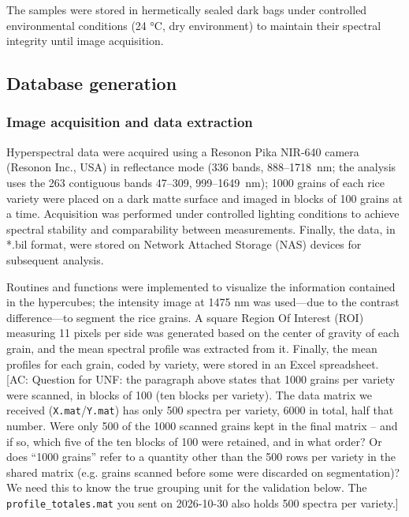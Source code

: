 \documentclass[final,5p,times,twocolumn]{elsarticle}
\newcommand{\added}[1]{{\color{blue}#1}}
\newcommand{\acnote}[1]{{\color{red}\small\textsf{[AC: #1]}}}
\begin{document}
The samples were stored in hermetically sealed dark bags under controlled environmental conditions (24 °C, dry environment) to maintain their spectral integrity until image acquisition.

\subsection{Database generation}\label{sec_database}

\subsubsection{Image acquisition and data extraction} 

Hyperspectral data were acquired using a Resonon Pika NIR-640 camera (Resonon Inc., USA) in reflectance mode \added{(336 bands, 888--1718~nm; the analysis uses the 263 contiguous bands 47--309, 999--1649~nm)}; \added{1000 grains of each rice variety were placed on a dark matte surface and imaged in blocks of 100 grains at a time.}
Acquisition was performed under controlled lighting conditions to achieve spectral stability and comparability between measurements.
\added{Finally, the data, in *.bil format, were stored on Network Attached Storage (NAS) devices for subsequent analysis.} 

Routines and functions were implemented to visualize the information contained in the hypercubes; the intensity image at 1475 nm was used—due to the contrast difference—to segment the rice grains.
A square Region Of Interest (ROI) measuring 11 pixels per side was generated based on the center of gravity of each grain, and the mean spectral profile was extracted from it.
Finally, the mean profiles for each grain, coded by variety, were stored in an Excel spreadsheet.
\acnote{Question for UNF: the paragraph above states that 1000 grains per variety were scanned, in blocks of 100 (ten blocks per variety). The data matrix we received (\texttt{X.mat}/\texttt{Y.mat}) has only 500 spectra per variety, 6000 in total, half that number. Were only 500 of the 1000 scanned grains kept in the final matrix -- and if so, which five of the ten blocks of 100 were retained, and in what order? Or does ``1000 grains'' refer to a quantity other than the 500 rows per variety in the shared matrix (e.g. grains scanned before some were discarded on segmentation)? We need this to know the true grouping unit for the validation below. The \texttt{profile\_totales.mat} you sent on 2026-10-30 also holds 500 spectra per variety.}
\end{document}
